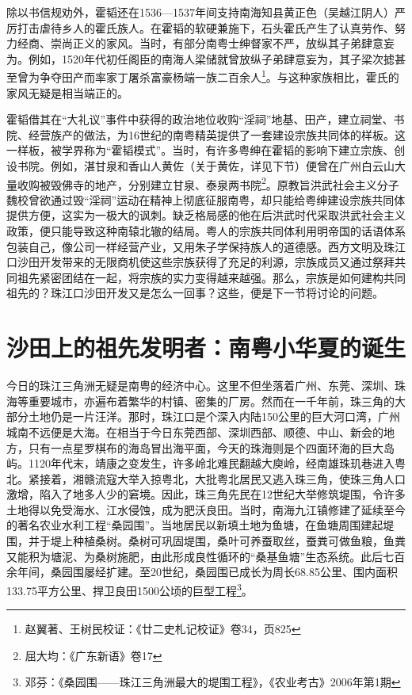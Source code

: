 除以书信规劝外，霍韬还在1536—1537年间支持南海知县黄正色（吴越江阴人）严厉打击虐待乡人的霍氏族人。在霍韬的软硬兼施下，石头霍氏产生了认真劳作、努力经商、崇尚正义的家风。当时，有部分南粤士绅督家不严，放纵其子弟肆意妄为。例如，1520年代初任阁臣的南海人梁储就曾放纵子弟肆意妄为，其子梁次摅甚至曾为争夺田产而率家丁屠杀富豪杨端一族二百余人\footnote{赵翼著、王树民校证：《廿二史札记校证》卷34，页825}。与这种家族相比，霍氏的家风无疑是相当端正的。

霍韬借其在“大礼议”事件中获得的政治地位收购“淫祠”地基、田产，建立祠堂、书院、经营族产的做法，为16世纪的南粤精英提供了一套建设宗族共同体的样板。这一样板，被学界称为“霍韬模式”。当时，有许多粤绅在霍韬的影响下建立宗族、创设书院。例如，湛甘泉和香山人黄佐（关于黄佐，详见下节）便曾在广州白云山大量收购被毁佛寺的地产，分别建立甘泉、泰泉两书院\footnote{屈大均：《广东新语》卷17}。原教旨洪武社会主义分子魏校曾欲通过毁“淫祠”运动在精神上彻底征服南粤，却只能给粤绅建设宗族共同体提供方便，这实为一极大的讽刺。缺乏格局感的他在后洪武时代采取洪武社会主义政策，便只能导致这种南辕北辙的结局。粤人的宗族共同体利用明帝国的话语体系包装自己，像公司一样经营产业，又用朱子学保持族人的道德感。西方文明及珠江口沙田开发带来的无限商机使这些宗族获得了充足的利源，宗族成员又通过祭拜共同祖先紧密团结在一起，将宗族的实力变得越来越强。那么，宗族是如何建构共同祖先的？珠江口沙田开发又是怎么一回事？这些，便是下一节将讨论的问题。

\section{沙田上的祖先发明者：南粤小华夏的诞生}

\indent 今日的珠江三角洲无疑是南粤的经济中心。这里不但坐落着广州、东莞、深圳、珠海等重要城市，亦遍布着繁华的村镇、密集的厂房。然而在一千年前，珠三角的大部分土地仍是一片汪洋。那时，珠江口是个深入内陆150公里的巨大河口湾，广州城南不远便是大海。在相当于今日东莞西部、深圳西部、顺德、中山、新会的地方，只有一点星罗棋布的海岛冒出海平面，今天的珠海则是个四面环海的巨大岛屿。1120年代末，靖康之变发生，许多岭北难民翻越大庾岭，经南雄珠玑巷进入粤北。紧接着，湘赣流寇大举入掠粤北，大批粤北居民又逃入珠三角，使珠三角人口激增，陷入了地多人少的窘境。因此，珠三角先民在12世纪大举修筑堤围，令许多土地得以免受海水、江水侵蚀，成为肥沃良田。当时，南海九江镇修建了延续至今的著名农业水利工程“桑园围”。当地居民以新填土地为鱼塘，在鱼塘周围建起堤围，并于堤上种植桑树。桑树可巩固堤围，桑叶可养蚕取丝，蚕粪可做鱼粮，鱼粪又能积为塘泥、为桑树施肥，由此形成良性循环的“桑基鱼塘”生态系统。此后七百余年间，桑园围屡经扩建。至20世纪，桑园围已成长为周长68.85公里、围内面积133.75平方公里、捍卫良田1500公顷的巨型工程\footnote{邓芬：《桑园围——珠江三角洲最大的堤围工程》，《农业考古》2006年第1期}。

